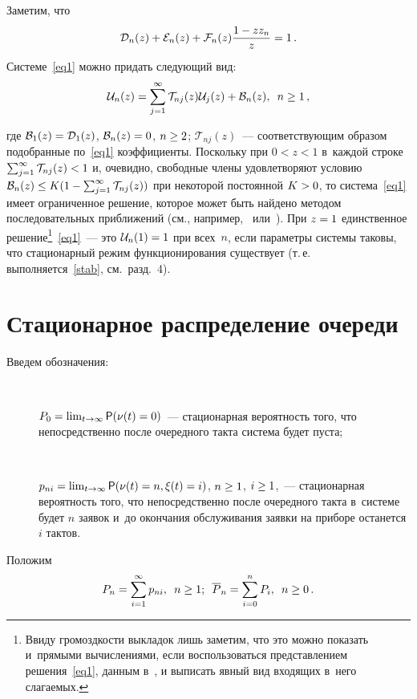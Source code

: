 \begin{multicols}{2}
Заметим, что 
$$\mathcal{D}_{n}(z) \hm+ \mathcal{E}_{n}(z)\hm + 
\mathcal{F}_{n}(z) \fr{1\hm-z z_n}{z}\hm=1\,.$$
Системе~\eqref{eq1} можно придать следующий вид:
$$
\mathcal{U}_{n}(z)=
\sum\limits_{j=1}^\infty \mathcal{T}_{nj}(z) \mathcal{U}_{j}(z)
+\mathcal{B}_n(z), \enskip n \ge 1\,,
$$

\noindent 
где $\mathcal{B}_1(z)\hm=\mathcal{D}_{1}(z)$, $\mathcal{B}_n(z)\hm=0$, 
$n\hm\ge 2$;
$\mathcal{T}_{nj}(z)$~--- соответствующим образом подобранные 
по~\eqref{eq1} коэффициенты.
Поскольку при $0<z<1$ в~каждой строке $\sum\nolimits_{j=1}^\infty 
\mathcal{T}_{nj}(z)\hm<1$
и, очевидно, свободные члены удовлетворяют условию
$\mathcal{B}_n(z) \hm\le K (1\hm-\sum\nolimits_{j=1}^\infty 
\mathcal{T}_{nj}(z))$
при некоторой постоянной $K\hm>0$,
то система~\eqref{eq1} имеет ограниченное решение, которое
может быть найдено методом последовательных приближений
(см., например,~\cite[теоремы~Ia,~IVa]{kry} или~\cite[теорема~1]{wil}).
При $z\hm=1$ единственное решение\footnote{Ввиду громоздкости выкладок 
лишь заметим, что это можно показать и~прямыми вычислениями,
если воспользоваться представлением решения~\eqref{eq1}, данным 
в~\cite[соотн.~(7)]{Car},
и выписать явный вид входящих в~него слагаемых.}~\eqref{eq1}~--- это 
$\mathcal{U}_{n}(1)\hm=1$ при всех~$n$, если параметры системы таковы, 
что
стационарный режим функционирования существует (т.\,е. 
выполняется~\eqref{stab}, см.\ разд.~4).


\section{Стационарное распределение очереди}

Введем обозначения:
\begin{description}
\item[\,]
$P_0=\lim\nolimits_{t \rightarrow \infty } {\sf P} (\nu(t)\hm=0)$~---
стационарная вероятность того, что непосредственно после очередного такта 
система будет
пуста;
\item[\,]
$p_{ni}=\lim\nolimits_{t \rightarrow \infty } {\sf P} (\nu(t)=n, 
\xi(t)\hm=i)$, $n \hm\ge 1$, $i \hm\ge 1$,~---
стационарная вероятность того, что непосредственно после очередного такта 
в~системе будет $n$
заявок и~до окончания обслуживания заявки на приборе останется $i$ 
тактов.
\end{description}

Положим
$$
P_n=\sum\limits_{i=1}^\infty p_{ni}, \enskip n \ge 1; \enskip {\overline 
P}_n=\sum\limits_{i=0}^n P_{i}, \enskip
 n \ge 0\,.
$$


\end{multicols}
